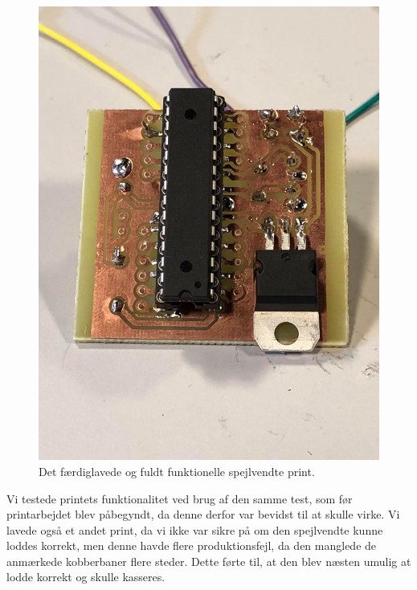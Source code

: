 \begin{figure}[H]
\centering
\includegraphics[scale=0.4]{Billeder/spejlvendtprint.jpg}
\caption{ Det færdiglavede og fuldt funktionelle spejlvendte print.}
\label{fig:print_test}
\end{figure}

Vi testede printets funktionalitet ved brug af den samme test, som før printarbejdet blev påbegyndt, da denne derfor var bevidst til at skulle virke. Vi lavede også et andet print, da vi ikke var sikre på om den spejlvendte kunne loddes korrekt, men denne havde flere produktionsfejl, da den manglede de anmærkede kobberbaner flere steder. Dette førte til, at den blev næsten umulig at lodde korrekt og skulle kasseres.

